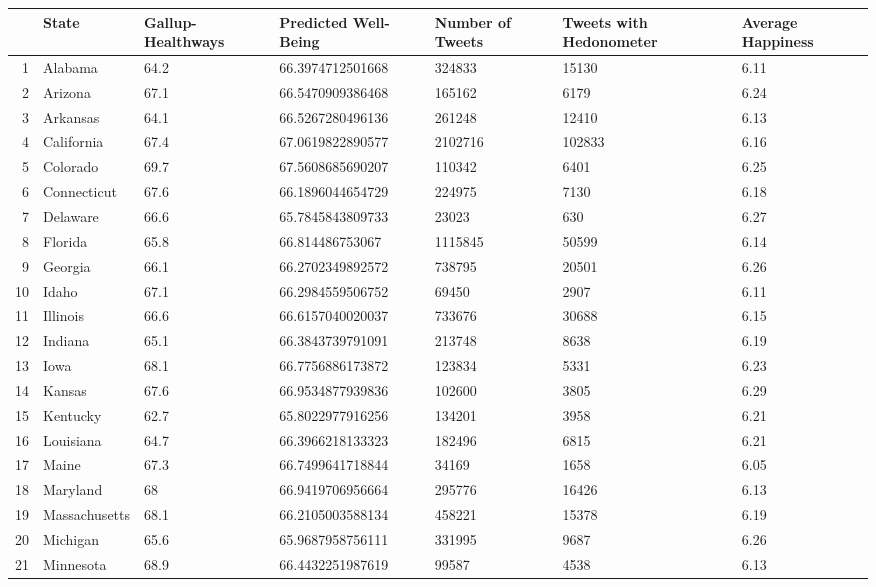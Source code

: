 \begin{table}[ht]
\centering
\begin{tabular}{rllllll}
  \hline
 & State & Gallup-Healthways & Predicted Well-Being & Number of Tweets & Tweets with Hedonometer & Average Happiness \\ 
  \hline
1 & Alabama & 64.2 & 66.3974712501668 & 324833 & 15130 & 6.11 \\ 
  2 & Arizona & 67.1 & 66.5470909386468 & 165162 & 6179 & 6.24 \\ 
  3 & Arkansas & 64.1 & 66.5267280496136 & 261248 & 12410 & 6.13 \\ 
  4 & California & 67.4 & 67.0619822890577 & 2102716 & 102833 & 6.16 \\ 
  5 & Colorado & 69.7 & 67.5608685690207 & 110342 & 6401 & 6.25 \\ 
  6 & Connecticut & 67.6 & 66.1896044654729 & 224975 & 7130 & 6.18 \\ 
  7 & Delaware & 66.6 & 65.7845843809733 & 23023 & 630 & 6.27 \\ 
  8 & Florida & 65.8 & 66.814486753067 & 1115845 & 50599 & 6.14 \\ 
  9 & Georgia & 66.1 & 66.2702349892572 & 738795 & 20501 & 6.26 \\ 
  10 & Idaho & 67.1 & 66.2984559506752 & 69450 & 2907 & 6.11 \\ 
  11 & Illinois & 66.6 & 66.6157040020037 & 733676 & 30688 & 6.15 \\ 
  12 & Indiana & 65.1 & 66.3843739791091 & 213748 & 8638 & 6.19 \\ 
  13 & Iowa & 68.1 & 66.7756886173872 & 123834 & 5331 & 6.23 \\ 
  14 & Kansas & 67.6 & 66.9534877939836 & 102600 & 3805 & 6.29 \\ 
  15 & Kentucky & 62.7 & 65.8022977916256 & 134201 & 3958 & 6.21 \\ 
  16 & Louisiana & 64.7 & 66.3966218133323 & 182496 & 6815 & 6.21 \\ 
  17 & Maine & 67.3 & 66.7499641718844 & 34169 & 1658 & 6.05 \\ 
  18 & Maryland & 68 & 66.9419706956664 & 295776 & 16426 & 6.13 \\ 
  19 & Massachusetts & 68.1 & 66.2105003588134 & 458221 & 15378 & 6.19 \\ 
  20 & Michigan & 65.6 & 65.9687958756111 & 331995 & 9687 & 6.26 \\ 
  21 & Minnesota & 68.9 & 66.4432251987619 & 99587 & 4538 & 6.13 \\ 

\end{tabular}
\end{table}
